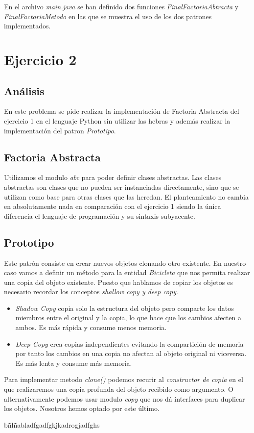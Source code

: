\documentclass{article}
\begin{document}
En el archivo \textit{main.java} se han definido dos funciones \textit{FinalFactoriaAbtracta} y \textit{FinalFactoriaMetodo}
en las que se muestra el uso de los dos patrones implementados. 	


\section{Ejercicio 2}
\subsection{Análisis}
En este problema se pide realizar la implementación de Factoria Abstracta del ejercicio 1 en el lenguaje Python sin utilizar las hebras y además realizar la implementación del patron \textit{Prototipo}. 

\subsection{Factoria Abstracta}
Utilizamos el modulo \textit{abc} para poder definir clases abstractas. Las clases abstractas son clases que no pueden ser instanciadas directamente, sino que se utilizan como base para otras clases que las heredan. 
El planteamiento no cambia en absolutamente nada en comparación con el ejercicio 1 siendo la única diferencia el lenguaje de programación y su sintaxis subyacente.

\subsection{Prototipo}
Este patrón consiste en crear nuevos objetos clonando otro existente. En nuestro caso vamos a definir un método para la entidad \textit{Bicicleta} que nos permita realizar una copia del objeto existente. Puesto que hablamos de copiar los objetos es necesario recordar los conceptos \textit{shallow copy y deep copy}. 

\begin{itemize}
	\item \textit{Shadow Copy}  copia solo la estructura  del objeto pero comparte los datos miembros entre el original y la copia, lo que hace que los cambios afecten a ambos. Es más rápida y consume menos memoria.
	
	\item \textit{Deep Copy }crea copias independientes evitando la compartición de memoria por tanto los cambios en una copia no afectan al objeto original ni viceversa. Es más lenta y consume más memoria.
\end{itemize}

Para implementar metodo \textit{clone()} podemos recurir al \textit{constructor de copia} en el que realizaremos una copia profunda del objeto recibido como argumento. O alternativamente podemos usar modulo \textit{copy} que nos dá interfaces para duplicar los objetos. Nosotros hemos optado por este último.

bñlñabladfgadfgkjkadrogjadfghs
\end{document}
